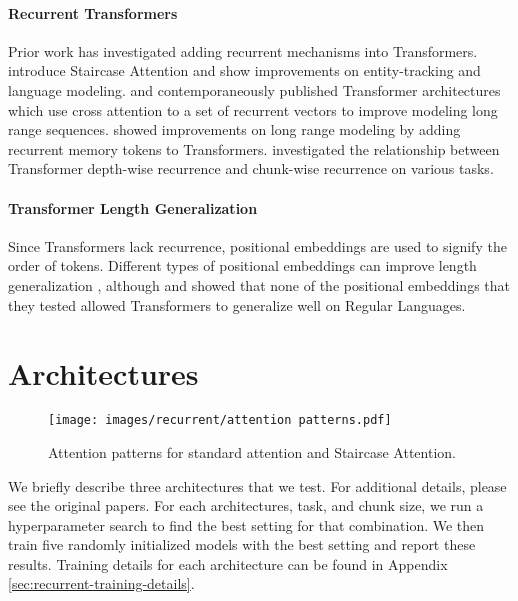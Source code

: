     \paragraph{Recurrent Transformers}
    Prior work has investigated adding recurrent mechanisms into Transformers. \citet{ju_staircase_2022} introduce Staircase Attention and show improvements on entity-tracking and language modeling.  \citet{hutchins_block-recurrent_2022} and \citet{didolkar_temporal_2022} contemporaneously published Transformer architectures which use cross attention to a set of recurrent vectors to improve modeling long range sequences. \citet{bulatov_recurrent_2022} showed improvements on long range modeling by adding recurrent memory tokens to Transformers. \citet{chowdhury_investigating_2024} investigated the relationship between Transformer depth-wise recurrence and chunk-wise recurrence on various tasks.
    
    \paragraph{Transformer Length Generalization}
    Since Transformers lack recurrence, positional embeddings are used to signify the order of tokens. Different types of positional embeddings can improve length generalization \citep{csordas_devil_2021, ruoss_randomized_2023, shaw_self-attention_2018, su_roformer_2024, zhou_transformers_2024, kazemnejad_impact_2023, press_train_2021}, although \citet{deletang_neural_2022} and \citet{ruoss_randomized_2023} showed that none of the positional embeddings that they tested allowed Transformers to generalize well on Regular Languages.
    
    \section{Architectures}
    \begin{figure}[ht]
        \centering
        \texttt{[image: images/recurrent/attention patterns.pdf]}
        \caption{Attention patterns for standard attention and Staircase Attention.}
        \label{fig:attention-patterns}
    \end{figure}
    
    We briefly describe three architectures that we test. For additional details, please see the original papers. For each architectures, task, and chunk size, we run a hyperparameter search to find the best setting for that combination. We then train five randomly initialized models with the best setting and report these results. Training details for each architecture can be found in Appendix \ref{sec:recurrent-training-details}.
    
